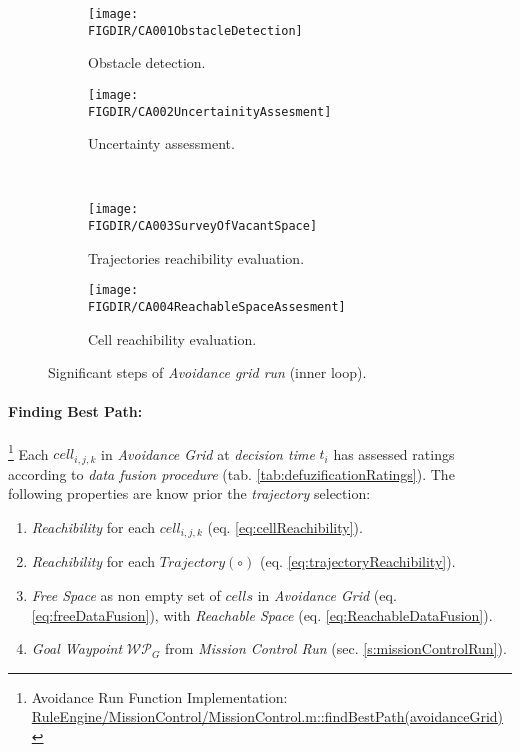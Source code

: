 \begin{figure}[H]
\centering
    \begin{subfigure}{0.48\textwidth}
        \texttt{[image: \\FIGDIR/CA001ObstacleDetection]}
        \caption{Obstacle detection.}
        \label{fig:obstacleDetectionAvoidanceGrid}
    \end{subfigure}
    \begin{subfigure}{0.48\textwidth}
        \texttt{[image: \\FIGDIR/CA002UncertainityAssesment]} 
        \caption{Uncertainty assessment.}
        \label{fig:uncertainityAssesmentAvoidanceGrid}
    \end{subfigure}
    \\
    \begin{subfigure}{0.48\textwidth}
        \texttt{[image: \\FIGDIR/CA003SurveyOfVacantSpace]} 
        \caption{Trajectories reachibility evaluation.}
        \label{fig:trajectoriesSafetyEvaluationAvoidanceGrid}
    \end{subfigure}
    \begin{subfigure}{0.48\textwidth}
        \texttt{[image: \\FIGDIR/CA004ReachableSpaceAssesment]} 
        \caption{Cell reachibility evaluation.}
        \label{fig:reachibilityAssessmentAvoidanceGrid}
    \end{subfigure}
    \caption{Significant steps of \emph{Avoidance grid run} (inner loop).}
    \label{fig:significantStepsofAvoidanceGridRun}
\end{figure}



\paragraph{Finding Best Path:} \footnote{Avoidance Run Function Implementation: \url{RuleEngine/MissionControl/MissionControl.m::findBestPath(avoidanceGrid)}} Each $cell_{i,j,k}$ in \emph{Avoidance Grid} at \emph{decision time} $t_i$ has assessed ratings according to \emph{data fusion procedure} (tab. \ref{tab:defuzificationRatings}). The following properties are know prior the \emph{trajectory} selection:
\begin{enumerate}
    \item \emph{Reachibility} for each  $cell_{i,j,k}$ (eq. \ref{eq:cellReachibility}).
    \item \emph{Reachibility} for each  $Trajectory(\circ)$ (eq. \ref{eq:trajectoryReachibility}).
    \item \emph{Free Space} as non empty set of $cells$ in \emph{Avoidance Grid} (eq. \ref{eq:freeDataFusion}), with \emph{Reachable Space} (eq. \ref{eq:ReachableDataFusion}).
    \item \emph{Goal Waypoint} $\mathscr{WP}_G$ from \emph{Mission Control Run} (sec. \ref{s:missionControlRun}).
\end{enumerate}

